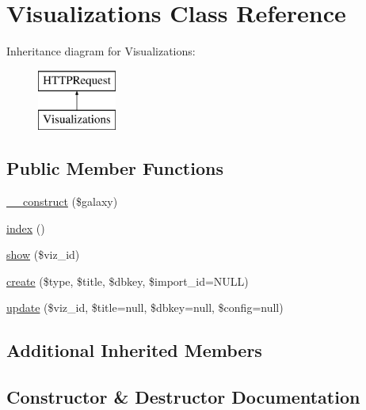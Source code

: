 \hypertarget{classVisualizations}{}\section{Visualizations Class Reference}
\label{classVisualizations}
Inheritance diagram for Visualizations\+:\begin{figure}[H]
\begin{center}
\leavevmode
\includegraphics[height=2.000000cm]{classVisualizations}
\end{center}
\end{figure}
\subsection*{Public Member Functions}
\begin{DoxyCompactItemize}
\item 
\hyperlink{classVisualizations_a718efd55867c65bbd67f6c9bb4c3803b}{\+\_\+\+\_\+construct} (\$galaxy)
\item 
\hyperlink{classVisualizations_ad5f186b859ab85b4246604fa28671c77}{index} ()
\item 
\hyperlink{classVisualizations_a21c55eeee76f2d68990382405159e908}{show} (\$viz\+\_\+id)
\item 
\hyperlink{classVisualizations_a8d6b51b5d14c79e698ce118ad05eb995}{create} (\$type, \$title, \$dbkey, \$import\+\_\+id=N\+U\+LL)
\item 
\hyperlink{classVisualizations_aed3835f460ec550d7e6128e43b7e2241}{update} (\$viz\+\_\+id, \$title=null, \$dbkey=null, \$config=null)
\end{DoxyCompactItemize}
\subsection*{Additional Inherited Members}


\subsection{Constructor \& Destructor Documentation}
